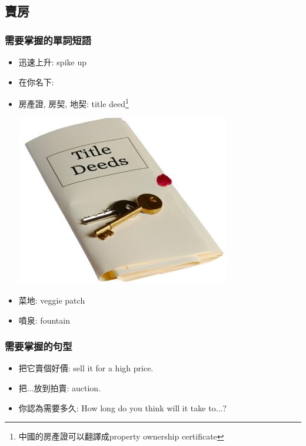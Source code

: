 \subsection{賣房}
\subsubsection*{需要掌握的單詞短語}
\begin{multicols}{2}
\begin{itemize}
  \itemsep0em
  \item 迅速上升: spike up
  \item 在你名下: 
  \item 房產證, 房契, 地契: title deed\footnote{中國的房產證可以翻譯成property ownership certificate}
  \begin{center}
  	\includegraphics[scale=.45]{pics/deed}
  \end{center}
  \item 菜地: veggie patch
  \item 噴泉: fountain
\end{itemize}
\end{multicols}

\subsubsection*{需要掌握的句型}
\begin{multicols}{2}
\begin{itemize}
  \itemsep0em
  \item 把它賣個好價: sell it for a high price.
  \item 把...放到拍賣:  auction.
  \item 你認為需要多久: How long do you think will it take to...?
\end{itemize}
\end{multicols}


